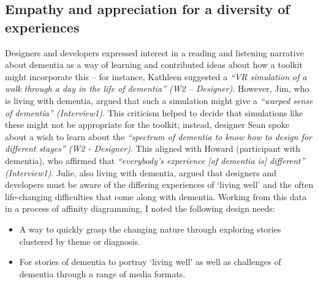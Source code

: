 \subsection{Empathy and appreciation for a diversity of experiences}
Designers and developers expressed interest in a reading and listening narrative about dementia as a way of learning and contributed ideas about how a toolkit might incorporate this – for instance, Kathleen suggested a \textit{``VR simulation of a walk through a day in the life of dementia'' (W2 – Designer)}. However, Jim, who is living with dementia, argued that such a simulation might give a \textit{``warped sense of dementia'' (Interview1)}. This criticism helped to decide that simulations like these might not be appropriate for the toolkit; instead, designer Sean spoke about a wish to learn about the \textit{``spectrum of dementia to know how to design for different stages'' (W2 - Designer)}. This aligned with Howard (participant with dementia), who affirmed that \textit{``everybody’s experience [of dementia is] different'' (Interview1)}. Julie, also living with dementia, argued that designers and developers must be aware of the differing experiences of `living well' and the often life-changing difficulties that come along with dementia. Working from this data in a process of affinity diagramming, I noted the following design needs:
\begin{itemize}
    \item A way to quickly grasp the changing nature through exploring stories clustered by theme or diagnosis.
    \item For stories of dementia to portray `living well' as well as challenges of dementia through a range of media formats.
\end{itemize}

